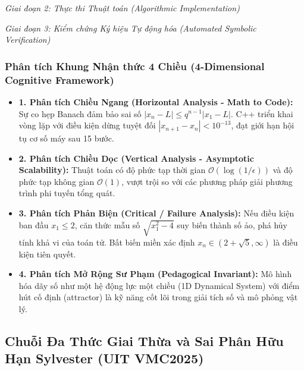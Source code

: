 \documentclass{article}
\begin{document}
\vspace{0.5em}\noindent\emph{Giai đoạn 2: Thực thi Thuật toán (Algorithmic Implementation)}


\vspace{0.5em}\noindent\emph{Giai đoạn 3: Kiểm chứng Ký hiệu Tự động hóa (Automated Symbolic Verification)}


\subsubsection*{Phân tích Khung Nhận thức 4 Chiều (4-Dimensional Cognitive Framework)}
\begin{itemize}
    \item \textbf{1. Phân tích Chiều Ngang (Horizontal Analysis - Math to Code):} Sự co hẹp Banach đảm bảo sai số $|x_n - L| \le q^{n-1} |x_1 - L|$. C++ triển khai vòng lặp với điều kiện dừng tuyệt đối $|x_{n+1} - x_n| < 10^{-13}$, đạt giới hạn hội tụ cơ số máy sau 15 bước.
    \item \textbf{2. Phân tích Chiều Dọc (Vertical Analysis - Asymptotic Scalability):} Thuật toán có độ phức tạp thời gian $\mathcal{O}(\log(1/\epsilon))$ và độ phức tạp không gian $\mathcal{O}(1)$, vượt trội so với các phương pháp giải phương trình phi tuyến tổng quát.
    \item \textbf{3. Phân tích Phản Biện (Critical / Failure Analysis):} Nếu điều kiện ban đầu $x_1 \le 2$, căn thức mẫu số $\sqrt{x_1^2-4}$ suy biến thành số ảo, phá hủy tính khả vi của toán tử. Bất biến miền xác định $x_n \in (2+\sqrt{5}, \infty)$ là điều kiện tiên quyết.
    \item \textbf{4. Phân tích Mở Rộng Sư Phạm (Pedagogical Invariant):} Mô hình hóa dãy số như một hệ động lực một chiều (1D Dynamical System) với điểm hút cố định (attractor) là kỹ năng cốt lõi trong giải tích số và mô phỏng vật lý.
\end{itemize}

\subsection{Chuỗi Đa Thức Giai Thừa và Sai Phân Hữu Hạn Sylvester (UIT VMC2025)}
\end{document}
